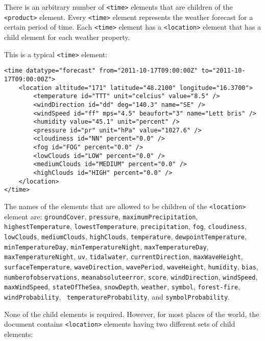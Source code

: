 There is an arbitrary number of \texttt{<time>} elements that are children of the \texttt{<product>} element. Every \texttt{<time>} element represents the weather forecast for a certain period of time. Each \texttt{<time>} element has a \texttt{<location>} element that has a child element for each weather property.

This is a typical \texttt{<time>} element:

\begin{lstlisting}
<time datatype="forecast" from="2011-10-17T09:00:00Z" to="2011-10-17T09:00:00Z">
	<location altitude="171" latitude="48.2100" longitude="16.3700">
		<temperature id="TTT" unit="celcius" value="8.5" />
		<windDirection id="dd" deg="140.3" name="SE" />
		<windSpeed id="ff" mps="4.5" beaufort="3" name="Lett bris" />
		<humidity value="45.1" unit="percent" />
		<pressure id="pr" unit="hPa" value="1027.6" />
		<cloudiness id="NN" percent="0.0" />
		<fog id="FOG" percent="0.0" />
		<lowClouds id="LOW" percent="0.0" />
		<mediumClouds id="MEDIUM" percent="0.0" />
		<highClouds id="HIGH" percent="0.0" />
	</location>
</time>
\end{lstlisting}

The names of the elements that are allowed to be children of the \texttt{<location>} element are: \texttt{groundCover}, \texttt{pressure}, \texttt{maximumPrecipitation}, \texttt{highestTemperature}, \texttt{lowestTemperature}, \texttt{precipitation}, \texttt{fog}, \texttt{cloudiness}, \texttt{lowClouds}, \texttt{mediumClouds}, \texttt{highClouds}, \texttt{temperature}, \texttt{dewpointTemperature}, \texttt{minTemperatureDay}, \texttt{minTemperatureNight}, \texttt{maxTemperatureDay}, \texttt{maxTemperatureNight}, \texttt{uv}, \texttt{tidalwater}, \texttt{currentDirection}, \texttt{maxWaveHeight}, \texttt{surfaceTemperature}, \texttt{waveDirection}, \texttt{wavePeriod}, \texttt{waveHeight}, \texttt{humidity}, \texttt{bias}, \texttt{numberofobservations}, \texttt{meanabsoluteerror}, \texttt{score}, \texttt{windDirection}, \texttt{windSpeed}, \texttt{maxWindSpeed}, \texttt{stateOfTheSea}, \texttt{snowDepth}, \texttt{weather}, \texttt{symbol}, \texttt{forest-fire}, \texttt{windProbability}, \texttt{
temperatureProbability}, and \texttt{symbolProbability}.

None of the child elements is required. However, for most places of the world, the  document contains \texttt{<location>} elements having two different sets of child elements:


